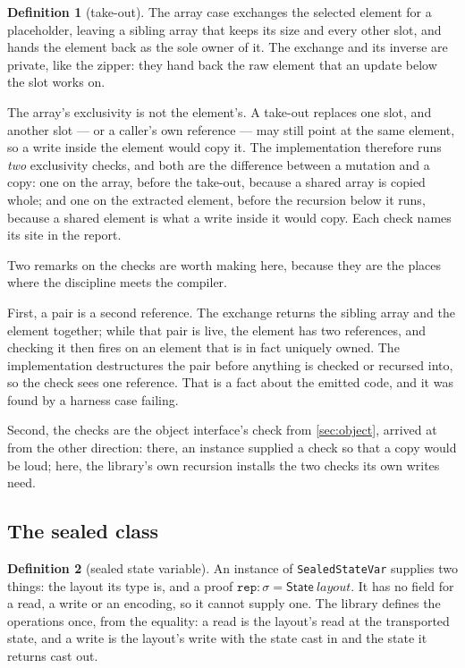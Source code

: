 \documentclass[11pt,a4paper]{article}
\theoremstyle{definition}
\newtheorem{definition}{Definition}[section]
\theoremstyle{plain}
\newcommand{\code}[1]{\texttt{#1}}
\begin{document}
\begin{definition}[take-out]\label{def:takeout}
The array case exchanges the selected element for a placeholder, leaving a
sibling array that keeps its size and every other slot, and hands the element
back as the sole owner of it. The exchange and its inverse are private, like the
zipper: they hand back the raw element that an update below the slot works on.
\end{definition}

The array's exclusivity is not the element's. A take-out replaces one slot, and
another slot --- or a caller's own reference --- may still point at the same
element, so a write inside the element would copy it. The implementation
therefore runs \emph{two} exclusivity checks, and both are the difference between
a mutation and a copy: one on the array, before the take-out, because a shared
array is copied whole; and one on the extracted element, before the recursion
below it runs, because a shared element is what a write inside it would copy.
Each check names its site in the report.

Two remarks on the checks are worth making here, because they are the places
where the discipline meets the compiler.

First, a pair is a second reference. The exchange returns the sibling array and
the element together; while that pair is live, the element has two references,
and checking it then fires on an element that is in fact uniquely owned. The
implementation destructures the pair before anything is checked or recursed
into, so the check sees one reference. That is a fact about the emitted code, and
it was found by a harness case failing.

Second, the checks are the object interface's check from \cref{sec:object},
arrived at from the other direction: there, an instance supplied a check so that
a copy would be loud; here, the library's own recursion installs the two checks
its own writes need.

\subsection{The sealed class}

\begin{definition}[sealed state variable]\label{def:sealed}
An instance of \code{SealedStateVar} supplies two things: the layout its type is,
and a proof $\code{rep} : \sigma = \mathsf{State}\ \mathit{layout}$. It has no
field for a read, a write or an encoding, so it cannot supply one. The library
defines the operations once, from the equality: a read is the layout's read at
the transported state, and a write is the layout's write with the state cast in
and the state it returns cast out.
\end{definition}
\end{document}
